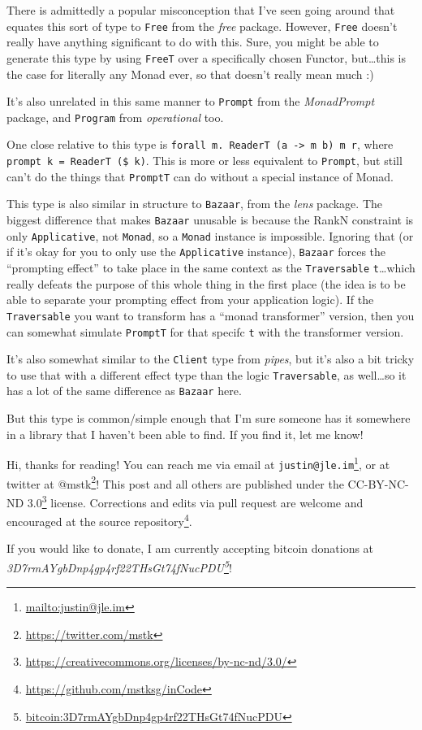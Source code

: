\documentclass[]{article}
\renewcommand{\href}[2]{#2\footnote{\url{#1}}}
\begin{document}
There is admittedly a popular misconception that I've seen going around that
equates this sort of type to \texttt{Free} from the \emph{free} package.
However, \texttt{Free} doesn't really have anything significant to do with this.
Sure, you might be able to generate this type by using \texttt{FreeT} over a
specifically chosen Functor, but\ldots{}this is the case for literally any Monad
ever, so that doesn't really mean much :)

It's also unrelated in this same manner to \texttt{Prompt} from the
\emph{MonadPrompt} package, and \texttt{Program} from \emph{operational} too.

One close relative to this type is
\texttt{forall\ m.\ ReaderT\ (a\ -\textgreater{}\ m\ b)\ m\ r}, where
\texttt{prompt\ k\ =\ ReaderT\ (\$\ k)}. This is more or less equivalent to
\texttt{Prompt}, but still can't do the things that \texttt{PromptT} can do
without a special instance of Monad.

This type is also similar in structure to \texttt{Bazaar}, from the \emph{lens}
package. The biggest difference that makes \texttt{Bazaar} unusable is because
the RankN constraint is only \texttt{Applicative}, not \texttt{Monad}, so a
\texttt{Monad} instance is impossible. Ignoring that (or if it's okay for you to
only use the \texttt{Applicative} instance), \texttt{Bazaar} forces the
``prompting effect'' to take place in the same context as the
\texttt{Traversable} \texttt{t}\ldots{}which really defeats the purpose of this
whole thing in the first place (the idea is to be able to separate your
prompting effect from your application logic). If the \texttt{Traversable} you
want to transform has a ``monad transformer'' version, then you can somewhat
simulate \texttt{PromptT} for that specifc \texttt{t} with the transformer
version.

It's also somewhat similar to the \texttt{Client} type from \emph{pipes}, but
it's also a bit tricky to use that with a different effect type than the logic
\texttt{Traversable}, as well\ldots{}so it has a lot of the same difference as
\texttt{Bazaar} here.

But this type is common/simple enough that I'm sure someone has it somewhere in
a library that I haven't been able to find. If you find it, let me know!

Hi, thanks for reading! You can reach me via email at
\href{mailto:justin@jle.im}{\nolinkurl{justin@jle.im}}, or at twitter at
\href{https://twitter.com/mstk}{@mstk}! This post and all others are published
under the \href{https://creativecommons.org/licenses/by-nc-nd/3.0/}{CC-BY-NC-ND
3.0} license. Corrections and edits via pull request are welcome and encouraged
at \href{https://github.com/mstksg/inCode}{the source repository}.

If you would like to donate, I am currently accepting bitcoin donations at
\emph{\href{bitcoin:3D7rmAYgbDnp4gp4rf22THsGt74fNucPDU}{3D7rmAYgbDnp4gp4rf22THsGt74fNucPDU}}!
\end{document}

